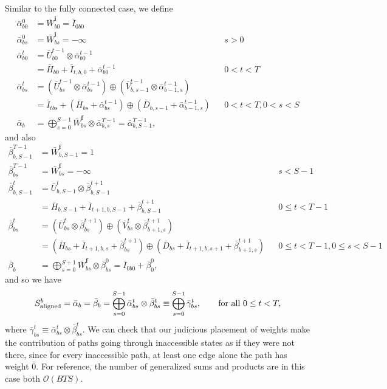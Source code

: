 \documentclass[a4paper]{article}
\begin{document}
Similar to the fully connected case, we define
\begin{align}
\bar\alpha^0_{b0} &= \bar{W}^{\mathbf{i}}_{b0} =\bar{I}_{0b0} \\
\bar\alpha^0_{bs} &= \bar{W}^{\mathbf{i}}_{bs} =-\infty && s>0\\
\bar\alpha^t_{b0} &= \bar{U}^{t-1}_{b0}\otimes\bar\alpha^{t-1}_{b0} 
\\
&=\bar{H}_{b0}+\bar{I}_{t,b,0}+\bar\alpha^{t-1}_{b0} && 0<t<T \\
\bar\alpha^t_{bs} &= (\bar{U}^{t-1}_{bs} \otimes\bar\alpha^{t-1}_{bs})\oplus (\bar{V}^{t-1}_{b,s-1} \otimes\bar\alpha^{t-1}_{b-1,s}) \\
&= \bar{I}_{tbs} + (\bar{H}_{bs} + \bar\alpha^{t-1}_{bs})\oplus (\bar{D}_{b, s-1} + \bar\alpha^{t-1}_{b-1,s}) && 0 < t < T, 0<s<S \\
\bar\alpha_b &= \bigoplus_{s=0}^{S-1} \bar{W}^{\mathbf{f}}_{bs} \otimes \bar\alpha^{T-1}_{b,s} = \bar\alpha^{T-1}_{b,S-1},
\end{align}
and also
\begin{align}
\bar\beta^{T-1}_{b,S-1} &= \bar{W}^{\mathbf{f}}_{b,S-1} =1 \\
\bar\beta^{T-1}_{bs} &= \bar{W}^{\mathbf{f}}_{bs} =-\infty && s<S-1\\
\bar\beta^t_{b,S-1} &= \bar{U}^{t}_{b,S-1}\otimes\bar\beta^{t+1}_{b,S-1} 
\\
&=\bar{H}_{b,S-1}+\bar{I}_{t+1,b,S-1}+\bar\beta^{t+1}_{b,S-1} && 0\leq t<T-1 \\
\bar\beta^t_{bs} &= (\bar{U}^{t}_{bs} \otimes\bar\beta^{t+1}_{bs})\oplus (\bar{V}^{t}_{bs} \otimes\bar\beta^{t+1}_{b+1,s}) \\
&= (\bar{H}_{bs} + \bar{I}_{t+1,b,s} + \bar\beta^{t+1}_{bs})\oplus (\bar{D}_{bs} + \bar{I}_{t+1,b, s+1} + \bar\beta^{t+1}_{b+1,s}) && 0 \leq t < T-1, 0\leq s<S-1 \\
\bar\beta_b &= \bigoplus_{s=0}^{S+1}\bar{W}^{\mathbf{f}}_{bs} \otimes \bar\beta^{0}_{bs} = \bar{I}_{0b0}  + \bar\beta^{0}_{0},
\end{align}
and so we have
\begin{equation}
S^b_{\rm{aligned}} = \bar\alpha_b = \bar\beta_b = \bigoplus_{s=0}^{S-1}\bar\alpha^t_{bs}\otimes \bar\beta^t_{bs}\equiv \bigoplus_{s=0}^{S-1}\bar\gamma^t_{bs},\qquad \textrm{for all } 0 \leq t < T,
\end{equation}
where $\bar\gamma^t_{bs} \equiv \bar\alpha^t_{bs}\otimes \bar\beta^t_{bs}$.
We can check that our judicious placement of weights make the contribution of paths going through inaccessible states as if they were not there, since for every inaccessible path, at least one edge alone the path has weight $\bar{0}$. For reference, the number of generalized sums and products are in this case both $\mathcal{O}(BTS)$.
\end{document}
